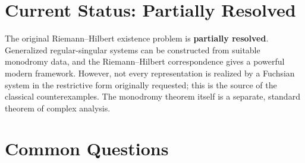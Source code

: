 \section{Current Status: Partially Resolved}

\begin{partiallybox}
The original Riemann--Hilbert existence problem is \textbf{partially resolved}. Generalized regular-singular systems can be constructed from suitable monodromy data, and the Riemann--Hilbert correspondence gives a powerful modern framework. However, not every representation is realized by a Fuchsian system in the restrictive form originally requested; this is the source of the classical counterexamples. The monodromy theorem itself is a separate, standard theorem of complex analysis.
\end{partiallybox}

\section*{Common Questions}

